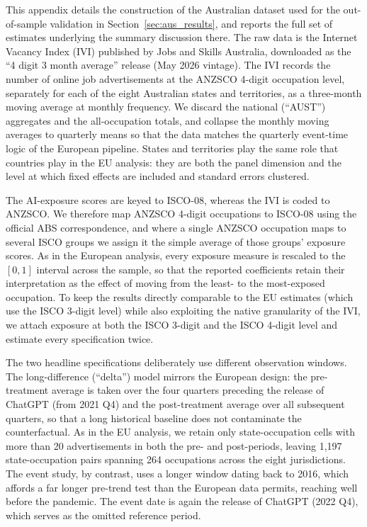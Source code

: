 \documentclass[11pt]{article}
\begin{document}
This appendix details the construction of the Australian dataset used for the out-of-sample validation in Section~\ref{sec:aus_results}, and reports the full set of estimates underlying the summary discussion there. The raw data is the Internet Vacancy Index (IVI) published by Jobs and Skills Australia, downloaded as the ``4 digit 3 month average'' release (May 2026 vintage). The IVI records the number of online job advertisements at the ANZSCO 4-digit occupation level, separately for each of the eight Australian states and territories, as a three-month moving average at monthly frequency. We discard the national (``AUST'') aggregates and the all-occupation totals, and collapse the monthly moving averages to quarterly means so that the data matches the quarterly event-time logic of the European pipeline. States and territories play the same role that countries play in the EU analysis: they are both the panel dimension and the level at which fixed effects are included and standard errors clustered.

The AI-exposure scores are keyed to ISCO-08, whereas the IVI is coded to ANZSCO. We therefore map ANZSCO 4-digit occupations to ISCO-08 using the official ABS correspondence, and where a single ANZSCO occupation maps to several ISCO groups we assign it the simple average of those groups' exposure scores. As in the European analysis, every exposure measure is rescaled to the $[0,1]$ interval across the sample, so that the reported coefficients retain their interpretation as the effect of moving from the least- to the most-exposed occupation. To keep the results directly comparable to the EU estimates (which use the ISCO 3-digit level) while also exploiting the native granularity of the IVI, we attach exposure at both the ISCO 3-digit and the ISCO 4-digit level and estimate every specification twice.

The two headline specifications deliberately use different observation windows. The long-difference (``delta'') model mirrors the European design: the pre-treatment average is taken over the four quarters preceding the release of ChatGPT (from 2021 Q4) and the post-treatment average over all subsequent quarters, so that a long historical baseline does not contaminate the counterfactual. As in the EU analysis, we retain only state-occupation cells with more than 20 advertisements in both the pre- and post-periods, leaving 1,197 state-occupation pairs spanning 264 occupations across the eight jurisdictions. The event study, by contrast, uses a longer window dating back to 2016, which affords a far longer pre-trend test than the European data permits, reaching well before the pandemic. The event date is again the release of ChatGPT (2022 Q4), which serves as the omitted reference period.
\end{document}
